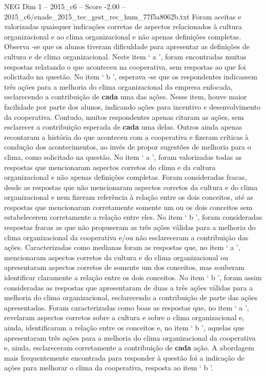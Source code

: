\begin{textsample}{NEG Dim 1 – 2015\_c6 – Score -2.00 – 2015\_c6/enade\_2015\_tec\_gest\_rec\_hum\_77f5a8062b.txt}
Foram aceitas e valorizadas quaisquer indicações corretas de aspectos relacionados à cultura organizacional e ao clima organizacional e não apenas definições completas.
Observa -se que os alunos tiveram dificuldade para apresentar as definições de cultura e de clima organizacional.
Neste item ‘ a ’, foram encontradas muitas respostas relatando o que aconteceu na cooperativa, sem respostas ao que foi solicitado na questão.
No item ‘ b ’, esperava -se que os respondentes indicassem três ações para a melhoria do clima organizacional da empresa enfocada, esclarecendo a contribuição de \textbf{cada} uma das ações.
Nesse item, houve maior facilidade por parte dos alunos, indicando ações para incentivo e desenvolvimento da cooperativa.
Contudo, muitos respondentes apenas citaram as ações, sem esclarecer a contribuição esperada de \textbf{cada} uma delas.
Outros ainda apenas recontaram a história do que aconteceu com a cooperativa e fizeram críticas à condução dos acontecimentos, ao invés de propor sugestões de melhoria para o clima, como solicitado na questão.
No item ‘ a ’, foram valorizadas todas as respostas que mencionaram aspectos corretos do clima e da cultura organizacional e não apenas definições completas.
Foram consideradas fracas, desde as respostas que não mencionaram aspectos corretos da cultura e do clima organizacional e nem fizeram referência à relação entre os dois conceitos, até as respostas que mencionaram corretamente somente um ou os dois conceitos sem estabelecerem corretamente a relação entre eles.
No item ‘ b ’, foram consideradas respostas fracas as que não propuseram as três ações válidas para a melhoria do clima organizacional da cooperativa e/ou não esclareceram a contribuição das ações.
Caracterizadas como medianas foram as respostas que, no item ‘ a ’, mencionaram aspectos corretos da cultura e do clima organizacional ou apresentaram aspectos corretos de somente um dos conceitos, mas souberam identificar claramente a relação entre os dois conceitos.
No item ‘ b ’, foram assim consideradas as respostas que apresentaram de duas a três ações válidas para a melhoria do clima organizacional, esclarecendo a contribuição de parte das ações apresentadas.
Foram caracterizadas como boas as respostas que, no item ‘ a ’, revelaram aspectos corretos sobre a cultura e sobre o clima organizacional e, ainda, identificaram a relação entre os conceitos e, no item ‘ b ’, aquelas que apresentaram três ações para a melhoria do clima organizacional da cooperativa e, ainda, esclareceram corretamente a contribuição de \textbf{cada} ação.
A abordagem mais frequentemente encontrada para responder à questão foi a indicação de ações para melhorar o clima da cooperativa, resposta ao item ‘ b ’.

\end{textsample}
